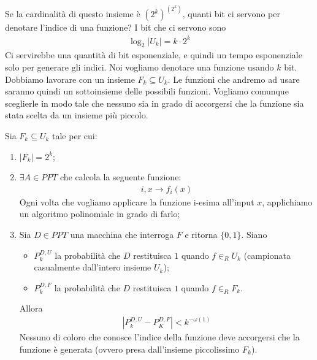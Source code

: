 \noindent Se la cardinalità di questo insieme è $(2^k)^{(2^k)}$, quanti bit ci servono per denotare l'indice di una funzione? I bit che ci servono sono
\begin{align*}
    \log_2 |U_k| = k \cdot 2^k
\end{align*}
\noindent Ci servirebbe una quantità di bit esponenziale, e quindi un tempo esponenziale solo per generare gli indici. Noi vogliamo denotare una funzione usando $k$ bit. Dobbiamo lavorare con un insieme $F_k \subseteq U_k$. Le funzioni che andremo ad usare saranno quindi un sottoinsieme delle possibili funzioni. Vogliamo comunque sceglierle in modo tale che nessuno sia in grado di accorgersi che la funzione sia stata scelta da un insieme più piccolo. 

\begin{definition}
    Sia $F_k \subseteq U_k$ tale per cui:
    \begin{enumerate}
        \item $|F_k| = 2^k$;
        \item $\exists A \in PPT$ che calcola la seguente funzione:
        \begin{align*}
            i, x \rightarrow f_i(x)
        \end{align*}
        Ogni volta che vogliamo applicare la funzione i-esima all'input $x$, applichiamo un algoritmo polinomiale in grado di farlo;
        \item Sia $D \in PPT$ una macchina che interroga $F$ e ritorna $\{0, 1\}$. Siano
        \begin{itemize}
            \item $P_k^{D, U}$ la probabilità che $D$ restituisca $1$ quando $f \in_R U_k$ (campionata casualmente dall'intero insieme $U_k$);
            \item $P_k^{D, F}$ la probabilità che $D$ restituisca $1$ quando $f \in_R F_k$.
        \end{itemize}
        Allora
        \begin{align*}
            \left| P_k^{D, U} - P_K^{D, F} \right| < k^{-\omega(1)}
        \end{align*}
        Nessuno di coloro che conosce l'indice della funzione deve accorgersi che la funzione è generata (ovvero presa dall'insieme piccolissimo $F_k$).
    \end{enumerate}
\end{definition}

